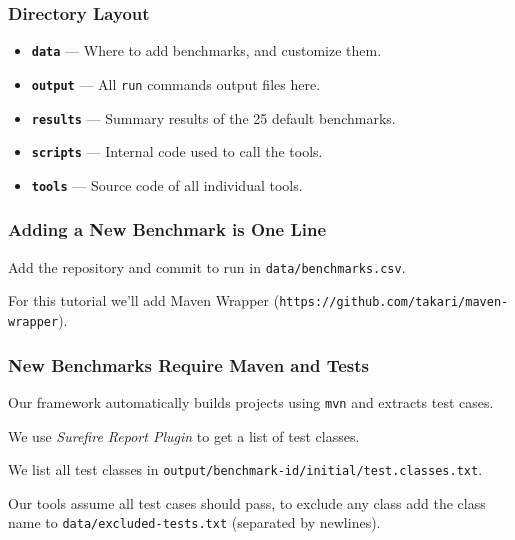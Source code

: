 \documentclass[aspectratio=169]{beamer}
\begin{document}
  \begin{frame}
    \frametitle{Directory Layout}

    \hspace{1em}
    \begin{itemize}
      \item[] {\bfseries \texttt{data}} --- Where to add benchmarks, and customize them.
      \vspace{1em}
      \item[] {\bfseries \texttt{output}} --- All \texttt{run} commands output files here.
      \vspace{1em}
      \item[] {\bfseries \texttt{results}} --- Summary results of the 25 default benchmarks.
      \vspace{1em}
      \item[] {\bfseries \texttt{scripts}} --- Internal code used to call the tools.
      \vspace{1em}
      \item[] {\bfseries \texttt{tools}} --- Source code of all individual tools.
    \end{itemize}
  \end{frame}

  \begin{frame}
    \frametitle{Adding a New Benchmark is One Line}

     Add the repository and commit to run in \texttt{data/benchmarks.csv}.

     \vspace{3em}

     For this tutorial we'll add Maven Wrapper (\texttt{https://github.com/takari/maven-wrapper}).
  \end{frame}

  \begin{frame}
    \frametitle{New Benchmarks Require Maven and Tests}

    Our framework automatically builds projects using \texttt{mvn} and extracts test cases.

    \vspace{1em}

    We use \textit{Surefire Report Plugin} to get a list of test classes.

    \vspace{3em}

    We list all test classes in \texttt{output/benchmark-id/initial/test.classes.txt}.

    \vspace{1em}

    Our tools assume all test cases should pass, to exclude any class add the class name to
    \texttt{data/excluded-tests.txt} (separated by newlines).
  \end{frame}
\end{document}
